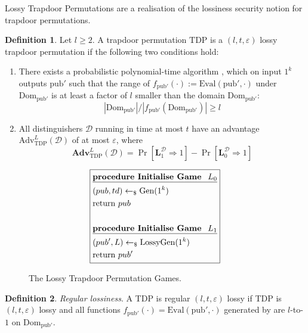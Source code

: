 \documentclass[]{final_report}
\theoremstyle{definition}
\newtheorem{definition}{Definition}[chapter]
\begin{document}
Lossy Trapdoor Permutations are a realisation of the lossiness security notion for trapdoor permutations.

\begin{definition}
Let \( l \geq 2 \). A trapdoor permutation \( \text{TDP} \) is a \( (l, t, \varepsilon) \) lossy trapdoor permutation if the following two conditions hold:

\begin{enumerate}
    \item There exists a probabilistic polynomial-time algorithm , which on input \( 1^k \) outputs \( \text{pub}' \) such that the range of \( f_{\text{pub}'}(\cdot) := \text{Eval}(\text{pub}', \cdot) \) under \( \text{Dom}_{\text{pub}'} \) is at least a factor of \( l \) smaller than the domain \( \text{Dom}_{\text{pub}'} \): 
    \[ |\text{Dom}_{\text{pub}'}|/|f_{\text{pub}'}(\text{Dom}_{\text{pub}'})| \geq l \]
    
    \item All distinguishers \( \mathcal{D} \) running in time at most \( t \) have an advantage \( \text{Adv}^L_{\text{TDP}}(\mathcal{D}) \) of at most \( \varepsilon \), where
    \[ \textbf{Adv}^L_{\text{TDP}}(\mathcal{D}) = \Pr[\textbf{L}_{1}^{\mathcal{D}}  \Rightarrow 1] - \Pr[\textbf{L}_{0}^{\mathcal{D}} \Rightarrow 1] \]
\end{enumerate}
\end{definition}

\begin{figure}[H]
\[
\boxed{
\begin{aligned}
&\underline{\textbf{\text{procedure Initialise Game } \(L_0\)}} \\
&(pub, td) \leftarrow_\$ \text{Gen}(1^k) \\
&\text{return } pub \\
\\
&\underline{\textbf{\text{procedure Initialise Game } \(L_1\)}} \\
&(pub', L) \leftarrow_\$ \text{LossyGen}(1^k) \\
&\text{return } pub' \\
\end{aligned}
}
\]
\caption{The Lossy Trapdoor Permutation Games.}
\label{fig:lossy_trapdoor_permutation_games}
\end{figure}

\begin{definition}
\textit{Regular lossiness}. A TDP is regular \( (l, t, \varepsilon) \) lossy if TDP is \( (l, t, \varepsilon) \) lossy and all functions \( f_{\text{pub}'}(\cdot) = \text{Eval}(\text{pub}', \cdot) \) generated by  are \( l \)-to-\( 1 \) on \( \text{Dom}_{\text{pub}'} \).
\end{definition}
\end{document}
